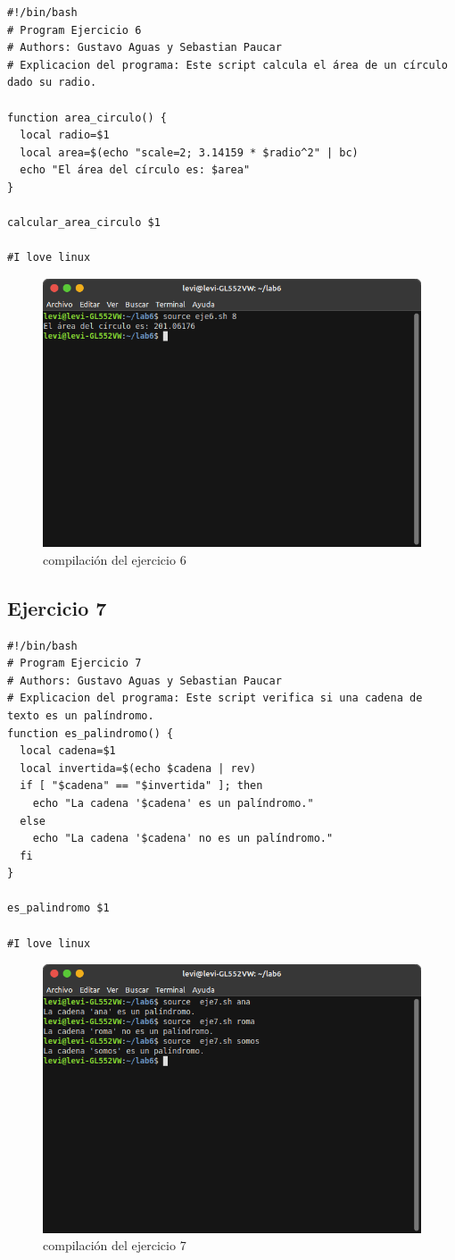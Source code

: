 \documentclass[11pt,twoside]{book}
\begin{document}
\begin{lstlisting}
#!/bin/bash
# Program Ejercicio 6
# Authors: Gustavo Aguas y Sebastian Paucar
# Explicacion del programa: Este script calcula el área de un círculo dado su radio.

function area_circulo() {
  local radio=$1
  local area=$(echo "scale=2; 3.14159 * $radio^2" | bc)
  echo "El área del círculo es: $area"
}

calcular_area_circulo $1

#I love linux
\end{lstlisting}
\begin{figure}[h]
    \centering
    \includegraphics[width=0.8\linewidth]{img_tarea6/eje6con.png}
    \caption{ compilación del ejercicio 6}
\end{figure}
\newpage
\subsection{Ejercicio 7}
\begin{lstlisting}
#!/bin/bash
# Program Ejercicio 7
# Authors: Gustavo Aguas y Sebastian Paucar
# Explicacion del programa: Este script verifica si una cadena de texto es un palíndromo.
function es_palindromo() {
  local cadena=$1
  local invertida=$(echo $cadena | rev)
  if [ "$cadena" == "$invertida" ]; then
    echo "La cadena '$cadena' es un palíndromo."
  else
    echo "La cadena '$cadena' no es un palíndromo."
  fi
}

es_palindromo $1

#I love linux

\end{lstlisting}
\begin{figure}[h]
    \centering
    \includegraphics[width=0.8\linewidth]{img_tarea6/eje7.png}
    \caption{ compilación del ejercicio 7}
\end{figure}
\newpage
\end{document}
